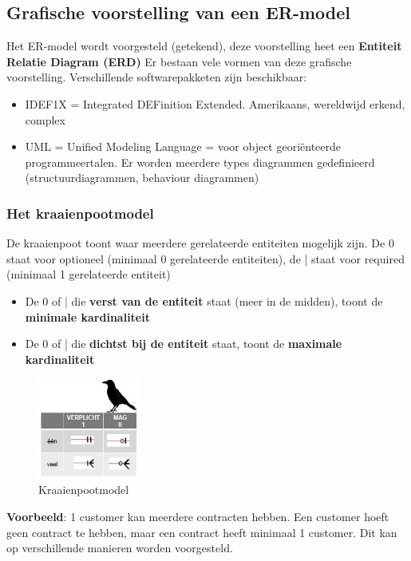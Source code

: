 \documentclass{article}
\newcommand{\bold}[1]{\textbf{#1}}
\begin{document}
\subsection{Grafische voorstelling van een ER-model}
Het ER-model wordt voorgesteld (getekend), deze voorstelling heet een \bold{Entiteit Relatie Diagram (ERD)}
Er bestaan vele vormen van deze grafische voorstelling. Verschillende softwarepakketen zijn beschikbaar:

\begin{itemize}
    \item IDEF1X = Integrated DEFinition Extended. Amerikaans, wereldwijd erkend, complex
    \item UML = Unified Modeling Language = voor object georiënteerde programmeertalen. 
    Er worden meerdere types diagrammen gedefinieerd (structuurdiagrammen, behaviour diagrammen)
\end{itemize}

\subsubsection{Het kraaienpootmodel}

De kraaienpoot toont waar meerdere gerelateerde entiteiten mogelijk zijn. De 0 staat voor optioneel
(minimaal 0 gerelateerde entiteiten), de | staat voor required (minimaal 1 gerelateerde entiteit)

\begin{itemize}
    \item De 0 of | die \bold{verst van de entiteit} staat (meer in de midden), toont de \bold{minimale kardinaliteit}
    \item De 0 of | die \bold{dichtst bij de entiteit} staat, toont de \bold{maximale kardinaliteit}
\end{itemize}


\begin{figure}[H]
    \centering
    \includegraphics[width=0.3\textwidth]{kraaienpootmodel.png}
    \caption{Kraaienpootmodel}
\end{figure}

\bold{Voorbeeld}: 1 customer kan meerdere contracten hebben. Een customer hoeft geen contract te
hebben, maar een contract heeft minimaal 1 customer. Dit kan op verschillende manieren worden voorgesteld. 
\end{document}
